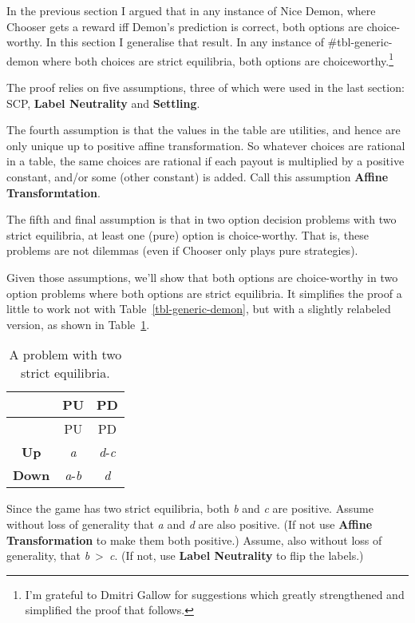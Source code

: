 \documentclass[
  10pt,
  letterpaper,
  DIV=11,
  numbers=noendperiod,
  twoside]{scrartcl}
\begin{document}
In the previous section I argued that in any instance of Nice Demon,
where Chooser gets a reward iff Demon's prediction is correct, both
options are choice-worthy. In this section I generalise that result. In
any instance of \#tbl-generic-demon where both choices are strict
equilibria, both options are choiceworthy.\footnote{I'm grateful to
  Dmitri Gallow for suggestions which greatly strengthened and
  simplified the proof that follows.}

The proof relies on five assumptions, three of which were used in the
last section: SCP, \textbf{Label Neutrality} and \textbf{Settling}.

The fourth assumption is that the values in the table are utilities, and
hence are only unique up to positive affine transformation. So whatever
choices are rational in a table, the same choices are rational if each
payout is multiplied by a positive constant, and/or some (other
constant) is added. Call this assumption \textbf{Affine
Transformtation}.

The fifth and final assumption is that in two option decision problems
with two strict equilibria, at least one (pure) option is choice-worthy.
That is, these problems are not dilemmas (even if Chooser only plays
pure strategies).

Given those assumptions, we'll show that both options are choice-worthy
in two option problems where both options are strict equilibria. It
simplifies the proof a little to work not with
Table~\ref{tbl-generic-demon}, but with a slightly relabeled version, as
shown in Table~\ref{tbl-two-good}.

\begin{longtable}[]{@{}ccc@{}}
\caption{A problem with two strict
equilibria.}\label{tbl-two-good}\tabularnewline
\toprule\noalign{}
& PU & PD \\
\midrule\noalign{}
\endfirsthead
\toprule\noalign{}
& PU & PD \\
\midrule\noalign{}
\endhead
\bottomrule\noalign{}
\endlastfoot
\textbf{Up} & \emph{a} & \emph{d}-\emph{c} \\
\textbf{Down} & \emph{a}-\emph{b} & \emph{d} \\
\end{longtable}

Since the game has two strict equilibria, both \emph{b} and \emph{c} are
positive. Assume without loss of generality that \emph{a} and \emph{d}
are also positive. (If not use \textbf{Affine Transformation} to make
them both positive.) Assume, also without loss of generality, that
\emph{b}~\textgreater~\emph{c}. (If not, use \textbf{Label Neutrality}
to flip the labels.)
\end{document}
